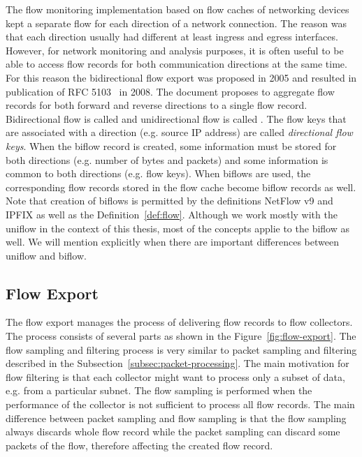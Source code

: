 The flow monitoring implementation based on flow caches of networking devices kept a separate flow for each direction of a network connection. The reason was that each direction usually had different at least  ingress and egress interfaces. However, for network monitoring and analysis purposes, it is often useful to be able to access flow records for both communication directions at the same time. For this reason the bidirectional flow export was proposed in 2005 and resulted in publication of RFC 5103~\cite{rfc5103} in 2008. The document proposes to aggregate flow records for both forward and reverse directions to a single flow record. Bidirectional flow is called \emph{} and unidirectional flow is called \emph{}. The flow keys that are associated with a direction (e.g. source IP address) are called \emph{directional flow keys}. When the biflow record is created, some information must be stored for both directions (e.g. number of bytes and packets) and some information is common to both directions (e.g. flow keys). When biflows are used, the corresponding flow records stored in the flow cache become biflow records as well. Note that creation of biflows is permitted by the definitions NetFlow v9 and IPFIX as well as the Definition~\ref{def:flow}. Although we work mostly with the uniflow in the context of this thesis, most of the concepts applie to the biflow as well. We will mention explicitly when there are important differences between uniflow and biflow.

\subsection{Flow Export}



The flow export manages the process of delivering flow records to flow collectors. The process consists of several parts as shown in the Figure~\ref{fig:flow-export}. The flow sampling and filtering process is very similar to packet sampling and filtering described in the Subsection~\ref{subsec:packet-processing}. The main motivation for flow filtering is that each collector might want to process only a subset of data, e.g. from a particular subnet. The flow sampling is performed when the performance of the collector is not sufficient to process all flow records. The main difference between packet sampling and flow sampling is that the flow sampling always discards whole flow record while the packet sampling can discard some packets of the flow, therefore affecting the created flow record. 

